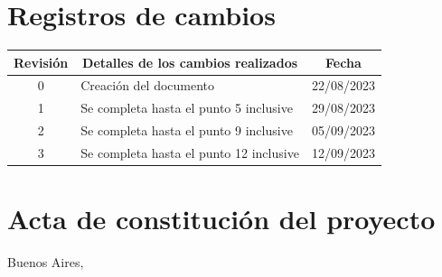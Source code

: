 \documentclass[
11pt, %
]{charter}
\begin{document}
\maketitle
\thispagestyle{empty}
\pagebreak


\thispagestyle{empty}
{\setlength{\parskip}{0pt}
\tableofcontents{}
}
\pagebreak


\section*{Registros de cambios}
\label{sec:registro}


\begin{table}[ht]
\label{tab:registro}
\centering
\begin{tabularx}{\linewidth}{@{}|c|X|c|@{}}
\hline
\rowcolor[HTML]{C0C0C0} 
Revisión & \multicolumn{1}{c|}{\cellcolor[HTML]{C0C0C0}Detalles de los cambios realizados} & Fecha      \\ \hline
0      	 & Creación del documento                                 & 22/08/2023 \\ \hline
1        & Se completa hasta el punto 5 inclusive                 & 29/08/2023 \\ \hline
2        & Se completa hasta el punto 9 inclusive				  & 05/09/2023 \\ \hline
3       & Se completa hasta el punto 12 inclusive                 & 12/09/2023 \\ \hline
\end{tabularx}
\end{table}

\pagebreak


\section*{Acta de constitución del proyecto}
\label{sec:acta}

\begin{flushright}
Buenos Aires, \fechaInicioName
\end{flushright}

\vspace{2cm}
\end{document}
